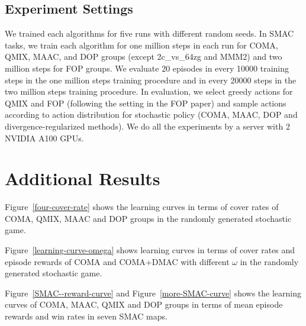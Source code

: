 \documentclass{article}
\begin{document}
	
\subsection{Experiment Settings}
	We trained each algorithms for five runs with different random seeds. In SMAC tasks, we train each algorithm for one million steps in each run for COMA, QMIX, MAAC, and DOP groups (except 2c\_vs\_64zg and MMM2) and two million steps for FOP groups. We evaluate 20 episodes in every 10000 training steps in the one million steps training procedure and in every 20000 steps in the two million steps training procedure. In evaluation, we select greedy actions for QMIX and FOP (following the setting in the FOP paper) and sample actions according to action distribution for stochastic policy (COMA, MAAC, DOP and divergence-regularized methods). We do all the experiments by a server with 2 NVIDIA A100 GPUs.

	
	
	\section{Additional Results}
	\label{app:add}
	
	

	



	Figure~\ref{four-cover-rate} shows the learning curves in terms of cover rates of COMA, QMIX, MAAC and DOP groups in the randomly generated stochastic game. 
		
	Figure~\ref{learning-curve-omega} shows learning curves in terms of cover rates and episode rewards of COMA and COMA+DMAC with different $\omega$ in the randomly generated stochastic game.
	
	Figure~\ref{SMAC--reward-curve} and Figure~\ref{more-SMAC-curve} shows the learning curves of COMA, MAAC, QMIX and DOP groups in terms of mean episode rewards and win rates in seven SMAC maps. 
	
\end{document}

